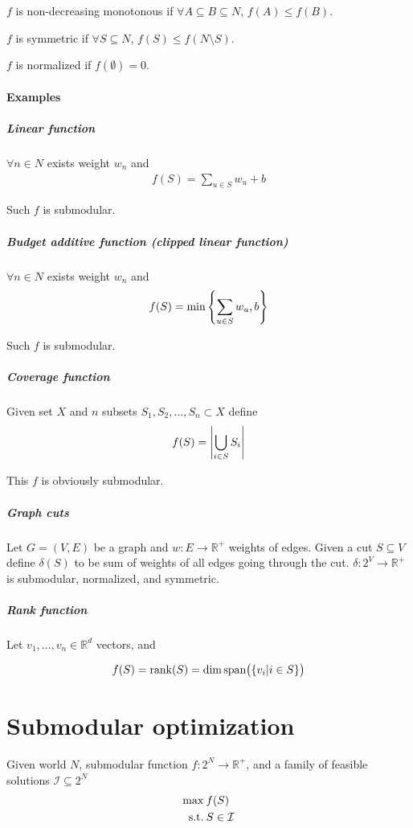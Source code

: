 \begin{definition}
	$f$ is non-decreasing monotonous if $\forall A\subseteq B \subseteq N$, $f(A) \leqslant f(B)$.
\end{definition}

\begin{definition}
	$f$ is symmetric if $\forall S \subseteq N$, $f(S) \leqslant f(N\setminus S)$.
\end{definition}
\begin{definition}
$f$ is normalized if $f(\emptyset) = 0$.
\end{definition}

\paragraph{Examples}
\subparagraph{Linear function}
$\forall n\in N$ exists weight $w_n$ and 
\begin{align}
f(S) = \sum_{u \in S} w_u + b
\end{align} 

Such $f$ is submodular.
\subparagraph{Budget additive function (clipped linear function)}
$\forall n\in N$ exists weight $w_n$ and 
\begin{align}
f(S) = \min \qty{ \sum_{u \in S} w_u,  b }
\end{align} 

Such $f$ is submodular.

\subparagraph{Coverage function}
Given set $X$ and $n$ subsets $S_1, S_2, \dots, S_n \subset X$ define
\begin{align}
f(S) = \abs{\bigcup_{i \in S} S_i}
\end{align}

This $f$ is obviously submodular.

\subparagraph{Graph cuts}
Let $G=(V,E)$ be a graph and $w: E\to \mathbb{R}^+$ weights of edges. Given a cut $S\subseteq V$ define $\delta(S)$ to be sum of weights of all edges going through the cut. $\delta : 2^V \to \mathbb{R}^+$ is submodular, normalized, and symmetric.


\subparagraph{Rank function}
Let $v_1, \dots, v_n \in \mathbb{R}^d$ vectors, and 

\begin{align}
f(S) = \rank (S) = \dim \text{span} \qty\big( \qty{ v_i | i \in S} )
\end{align}


\section{Submodular optimization}
Given world $N$, submodular function $f: 2^N \to \mathbb{R}^+$, and a family of feasible solutions $\mathcal{I} \subseteq 2^N$
\begin{align}
\max \:& f(S)\\
\text{s.t.} \: & S\in \mathcal{I}
\end{align}

